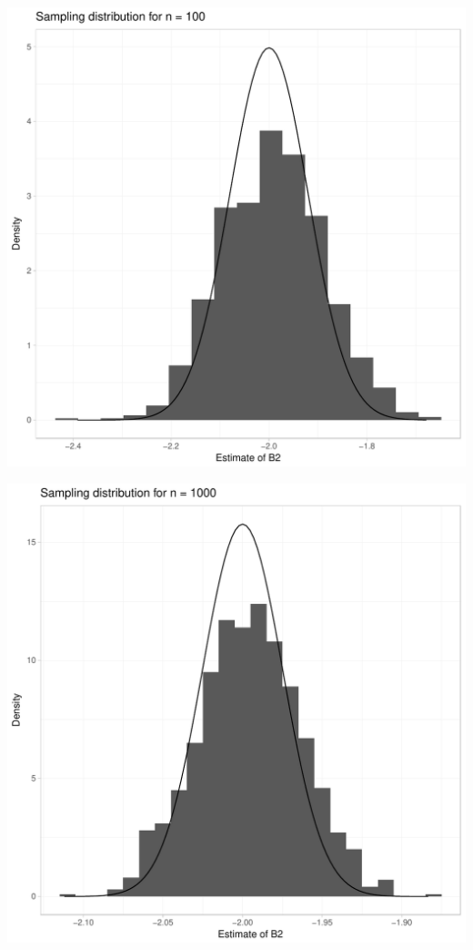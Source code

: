 \documentclass[english, 11pt]{article}\usepackage[]{graphicx}\usepackage[]{color}
\makeatletter
\def\maxwidth{ %
  \ifdim\Gin@nat@width>\linewidth
    \linewidth
  \else
    \Gin@nat@width
  \fi
}
\newenvironment{knitrout}{}{} %
\makeatother
\begin{document}
\begin{knitrout}
\includegraphics[width=\maxwidth]{figure/Part_B-2} 

\includegraphics[width=\maxwidth]{figure/Part_B-3} 


\end{knitrout}
\end{document}

